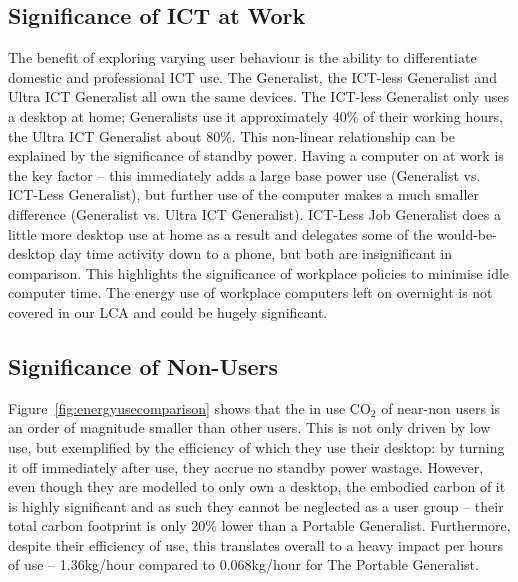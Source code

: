 \documentclass[conference]{IEEEtran}
\begin{document}

\subsection{Significance of ICT at Work}

The benefit of exploring varying user behaviour is the ability to
differentiate domestic and professional ICT use. The Generalist, the
ICT-less Generalist and Ultra ICT Generalist all own the same
devices. The ICT-less Generalist only uses a desktop at home;
Generalists use it approximately 40\% of their working hours, the
Ultra ICT Generalist about 80\%.  This non-linear relationship can be
explained by the significance of standby power. Having a computer on
at work is the key factor -- this immediately adds a large base power
use (Generalist vs. ICT-Less Generalist), but further use of the
computer makes a much smaller difference (Generalist vs. Ultra ICT
Generalist). ICT-Less Job Generalist does a little more desktop use at
home as a result and delegates some of the would-be-desktop day time
activity down to a phone, but both are insignificant in
comparison. This highlights the significance of workplace policies to
minimise idle computer time. The energy use of workplace computers
left on overnight is not covered in our LCA and could be hugely
significant.



\subsection{Significance of Non-Users}

Figure~\ref{fig:energyusecomparison} shows that the in use CO$_2$ of
near-non users is an order of magnitude smaller than other users. This
is not only driven by low use, but exemplified by the efficiency of
which they use their desktop: by turning it off immediately after use,
they accrue no standby power wastage. However, even though they are
modelled to only own a desktop, the embodied carbon of it is highly
significant and as such they cannot be neglected as a user group --
their total carbon footprint is only 20\% lower than a Portable
Generalist. Furthermore, despite their efficiency of use, this
translates overall to a heavy impact per hours of use -- 1.36kg/hour
compared to 0.068kg/hour for The Portable Generalist.
\end{document}
